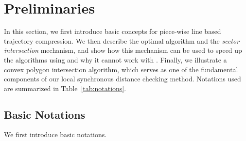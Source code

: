 \section{Preliminaries}
\label{sec-preliminary}

In this section, we first introduce basic concepts for piece-wise line based trajectory compression.
We then describe the optimal \lsa algorithm and the \textit{sector intersection} mechanism, and show how this mechanism can be used to speed up the \lsa algorithms using \ped and why it cannot work with \sed.
Finally, we illustrate a convex polygon intersection algorithm, which serves as one of the fundamental components of our local synchronous distance checking method.
%
Notations used are summarized in Table~\ref{tab:notations}.






\subsection{Basic Notations}
\label{subsec-notation}

We first introduce basic notations.


